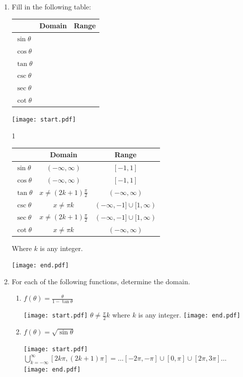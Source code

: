 \documentclass[12pt]{article}
\begin{document}
\begin{enumerate}
\item Fill in the following table:
\begin{center}
\begin{tabular}{l|c|c}
& Domain & Range\\
\hline
$\sin{\theta}$ & &\\
\hline
$\cos{\theta}$ & &\\
\hline
$\tan{\theta}$ & &\\
\hline
$\csc{\theta}$ & &\\
\hline
$\sec{\theta}$ & &\\
\hline
$\cot{\theta}$ & &
\end{tabular}
\end{center}

\texttt{[image: start.pdf]}
{{1\linewidth}{
\begin{center}
\begin{tabular}{l|c|c}
& Domain & Range\\
\hline
$\sin{\theta}$ & $(-\infty,\infty)$ & $[-1,1]$\\
\hline
$\cos{\theta}$ & $(-\infty,\infty)$ & $[-1,1]$\\
\hline
$\tan{\theta}$ & $x\neq(2k+1)\frac{\pi}{2}$ & $(-\infty,\infty)$\\
\hline
$\csc{\theta}$ & $x\neq \pi k$ & $(-\infty,-1]\cup[1,\infty)$\\
\hline
$\sec{\theta}$ & $x\neq(2k+1)\frac{\pi}{2}$ & $(-\infty,-1]\cup[1,\infty)$\\
\hline
$\cot{\theta}$ & $x\neq \pi k$ & $(-\infty,\infty)$\\
\end{tabular}
\end{center}
Where $k$ is any integer.
}}
\texttt{[image: end.pdf]}


\item For each of the following functions, determine the domain.  

\begin{enumerate}

\item $f(\theta)=\frac{\theta}{1-\tan{\theta}}$

\texttt{[image: start.pdf]}
{$\theta\neq \frac{\pi}{2}k$ where $k$ is any integer.}
\texttt{[image: end.pdf]}


\item $f(\theta)=\sqrt{\sin{\theta}}$

\texttt{[image: start.pdf]}
{ $\bigcup\limits_{k=-\infty}^{\infty} \left[2k \pi, (2k+1)\pi\right]=\dots [-2\pi,-\pi]\cup[0,\pi]\cup[2\pi,3\pi]\dots$}
\texttt{[image: end.pdf]}


\end{enumerate}


\end{enumerate}
\end{document}
